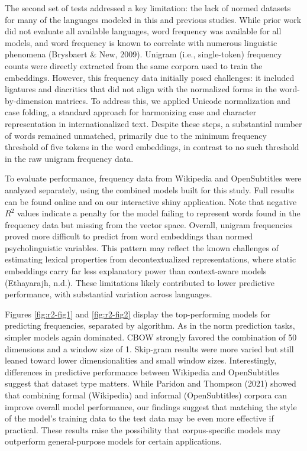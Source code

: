 \documentclass[
  english,
  man,floatsintext]{apa6}
\begin{document}
The second set of tests addressed a key limitation: the lack of normed datasets for many of the languages modeled in this and previous studies. While prior work did not evaluate all available languages, word frequency was available for all models, and word frequency is known to correlate with numerous linguistic phenomena (Brysbaert \& New, 2009). Unigram (i.e., single-token) frequency counts were directly extracted from the same corpora used to train the embeddings. However, this frequency data initially posed challenges: it included ligatures and diacritics that did not align with the normalized forms in the word-by-dimension matrices. To address this, we applied Unicode normalization and case folding, a standard approach for harmonizing case and character representation in internationalized text. Despite these steps, a substantial number of words remained unmatched, primarily due to the minimum frequency threshold of five tokens in the word embeddings, in contrast to no such threshold in the raw unigram frequency data.

To evaluate performance, frequency data from Wikipedia and OpenSubtitles were analyzed separately, using the combined models built for this study. Full results can be found online and on our interactive shiny application. Note that negative \(R^2\) values indicate a penalty for the model failing to represent words found in the frequency data but missing from the vector space. Overall, unigram frequencies proved more difficult to predict from word embeddings than normed psycholinguistic variables. This pattern may reflect the known challenges of estimating lexical properties from decontextualized representations, where static embeddings carry far less explanatory power than context-aware models (Ethayarajh, n.d.). These limitations likely contributed to lower predictive performance, with substantial variation across languages.

Figures \ref{fig:r2-fig1} and \ref{fig:r2-fig2} display the top-performing models for predicting frequencies, separated by algorithm. As in the norm prediction tasks, simpler models again dominated. CBOW strongly favored the combination of 50 dimensions and a window size of 1. Skip-gram results were more varied but still leaned toward lower dimensionalities and small window sizes. Interestingly, differences in predictive performance between Wikipedia and OpenSubtitles suggest that dataset type matters. While Paridon and Thompson (2021) showed that combining formal (Wikipedia) and informal (OpenSubtitles) corpora can improve overall model performance, our findings suggest that matching the style of the model's training data to the test data may be even more effective if practical. These results raise the possibility that corpus-specific models may outperform general-purpose models for certain applications.
\end{document}
